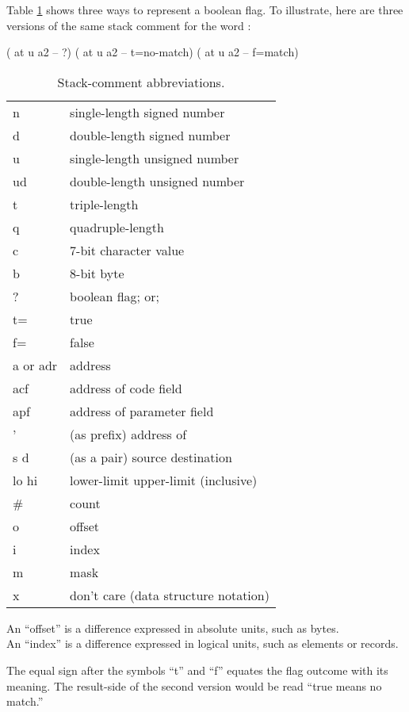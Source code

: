 Table \ref{tab-5-2} shows three ways to represent a boolean flag.  To
illustrate, here are three versions of the same stack comment for the
word :
\begin{Code}
( at u a2 -- ?)
( at u a2 -- t=no-match)
( at u a2 -- f=match)
\end{Code}
\begin{table}[hhhh]
\caption{Stack-comment abbreviations.}
\label{tab-5-2}
\vspace{1ex}
\blackline{1ex}
\begin{tabular}{@{\hspace{2.5em}}ll}
n             &  single-length signed number \\
d             &  double-length signed number \\
u             &  single-length unsigned number \\
ud            &  double-length unsigned number \\
t             &  triple-length \\
q             &  quadruple-length \\
c             &  7-bit character value \\
b             &  8-bit byte \\
?             &  boolean flag; or; \\
\quad t=         &  true \\
\quad f=         &  false \\
a or adr      &  address \\
acf           &  address of code field \\
apf           &  address of parameter field \\
'             &  (as prefix) address of \\
s d           &  (as a pair) source destination \\
lo hi         &  lower-limit upper-limit (inclusive) \\
\#            &   count \\
o             &  offset \\
i             &  index \\
m             &  mask \\
x             &  don't care (data structure notation) \\
\end{tabular}
\smallskip

An ``offset'' is a difference expressed in absolute units, such as bytes.\\
An ``index'' is a difference expressed in logical units, such as
elements or records.
\vspace{0ex}
\blackline{0ex}
\end{table}
The equal sign after the symbols ``t'' and ``f'' equates the flag
outcome with its meaning.  The result-side of the second version would
be read ``true means no match.''

